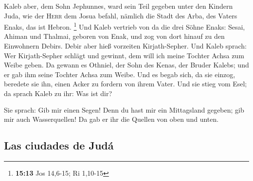  Kaleb aber, dem Sohn Jephunnes, ward sein Teil gegeben
unter den Kindern Juda, wie der \textsc{Herr} dem Josua befahl, nämlich
die Stadt des Arba, des Vaters Enaks, das ist Hebron. \footnote{\textbf{15:13}
  Jos 14,6-15; Ri 1,10-15}  Und Kaleb vertrieb von da die
drei Söhne Enaks: Sesai, Ahiman und Thalmai, geboren von Enak,
 und zog von dort hinauf zu den Einwohnern Debirs. Debir
aber hieß vorzeiten Kirjath-Sepher.  Und Kaleb sprach:
Wer Kirjath-Sepher schlägt und gewinnt, dem will ich meine Tochter Achsa
zum Weibe geben.  Da gewann es Othniel, der Sohn des
Kenas, der Bruder Kalebs; und er gab ihm seine Tochter Achsa zum Weibe.
 Und es begab sich, da sie einzog, beredete sie ihn,
einen Acker zu fordern von ihrem Vater. Und sie stieg vom Esel; da
sprach Kaleb zu ihr: Was ist dir?

 Sie sprach: Gib mir einen Segen! Denn du hast mir ein
Mittagsland gegeben; gib mir auch Wasserquellen! Da gab er ihr die
Quellen von oben und unten.

\hypertarget{las-ciudades-de-juduxe1}{%
\subsection{Las ciudades de Judá}\label{las-ciudades-de-juduxe1}}

